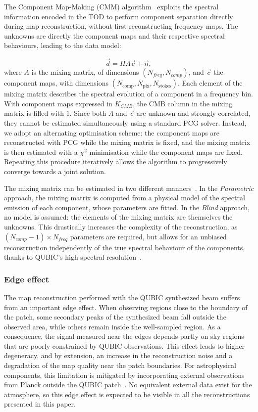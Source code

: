 \documentclass[a4paper,11pt]{article}
\begin{document}
The Component Map-Making (CMM) algorithm~\cite{cmm} exploits the spectral information encoded in the TOD to perform component separation directly during map reconstruction, without first reconstructing frequency maps. The unknowns are directly the component maps and their respective spectral behaviours, leading to the data model:

\begin{equation} \label{eq:cmm}
    \vec{d} = H A \vec{c} + \vec{n},
\end{equation}
where $A$ is the mixing matrix, of dimensions $(N_{freq}, N_{comp})$, and $\vec{c}$ the component maps, with dimensions $(N_{\mathrm{comp}}, N_{\mathrm{pix}}, N_{\mathrm{stokes}})$. Each element of the mixing matrix describes the spectral evolution of a component in a frequency bin. With component maps expressed in $K_{CMB}$, the CMB column in the mixing matrix is filled with $1$. Since both $A$ and $\vec{c}$ are unknown and strongly correlated, they cannot be estimated simultaneously using a standard PCG solver. Instead, we adopt an alternating optimisation scheme: the component maps are reconstructed with PCG while the mixing matrix is fixed, and the mixing matrix is then estimated with a $\chi^2$ minimisation while the component maps are fixed. Repeating this procedure iteratively allows the algorithm to progressively converge towards a joint solution.

The mixing matrix can be estimated in two different manners~\cite{cmm}. In the \emph{Parametric} approach, the mixing matrix is computed from a physical model of the spectral emission of each component, whose parameters are fitted. In the \emph{Blind} approach, no model is assumed: the elements of the mixing matrix are themselves the unknowns. This drastically increases the complexity of the reconstruction, as $\left(N_{comp}-1\right)\times N_{freq}$ parameters are required, but allows for an unbiased reconstruction independently of the true spectral behaviour of the components, thanks to QUBIC's high spectral resolution~\cite{cmm, regnier2024}.

\subsubsection{Edge effect}
\label{sec:edge_effect}

The map reconstruction performed with the QUBIC synthesized beam suffers from an important edge effect. When observing regions close to the boundary of the patch, some secondary peaks of the synthesized beam fall outside the observed area, while others remain inside the well-sampled region. As a consequence, the signal measured near the edges depends partly on sky regions that are poorly constrained by QUBIC observations. This effect leads to higher degeneracy, and by extension, an increase in the reconstruction noise and a degradation of the map quality near the patch boundaries. For astrophysical components, this limitation is mitigated by incorporating external observations from Planck outside the QUBIC patch~\cite{cmm}. No equivalent external data exist for the atmosphere, so this edge effect is expected to be visible in all the reconstructions presented in this paper.
\end{document}
